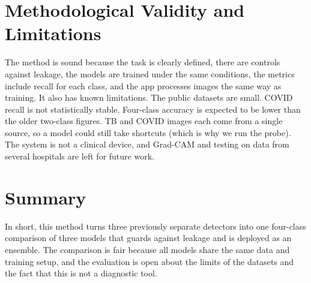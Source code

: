 \section{Methodological Validity and Limitations}

The method is sound because the task is clearly defined, there are controls against leakage, the models are trained under the same conditions, the metrics include recall for each class, and the app processes images the same way as training. It also has known limitations. The public datasets are small. COVID recall is not statistically stable. Four-class accuracy is expected to be lower than the older two-class figures. TB and COVID images each come from a single source, so a model could still take shortcuts (which is why we run the probe). The system is not a clinical device, and Grad-CAM and testing on data from several hospitals are left for future work.

\section{Summary}

In short, this method turns three previously separate detectors into one four-class comparison of three models that guards against leakage and is deployed as an ensemble. The comparison is fair because all models share the same data and training setup, and the evaluation is open about the limits of the datasets and the fact that this is not a diagnostic tool.
